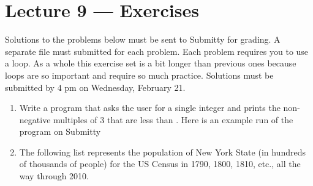 \documentclass[letterpaper,10pt,english]{sphinxmanual}
\begin{document}
\chapter{Lecture 9 — Exercises}
\label{\detokenize{lecture_notes/lec09_loops1_while_exercises/exercises:lecture-9-exercises}}\label{\detokenize{lecture_notes/lec09_loops1_while_exercises/exercises::doc}}
Solutions to the problems below must be sent to Submitty for grading.
A separate file must submitted for each problem.  Each problem
requires you to use a  loop. As a whole this exercise set is a
bit longer than previous ones because loops are so important and
require so much practice.  Solutions must be submitted by 4 pm on
Wednesday, February 21.
\begin{enumerate}
\item {} 
Write a program that asks the user for a single integer  and
prints the non-negative multiples of 3 that are less than .
Here is an example run of the program on Submitty

%
\begin{sphinxVerbatim}[commandchars=\\\{\}]
    
\end{sphinxVerbatim}

\item {} 
The following list represents the population of New York State (in
hundreds of thousands of people) for the US Census in 1790, 1800,
1810, etc., all the way through 2010.

%
\begin{sphinxVerbatim}[commandchars=\\\{\}]
  \PYG{p}{[}           \PYGZbs{}
                    \PYGZbs{}
                 \PYG{p}{]}
\end{sphinxVerbatim}


\end{enumerate}
\end{document}
